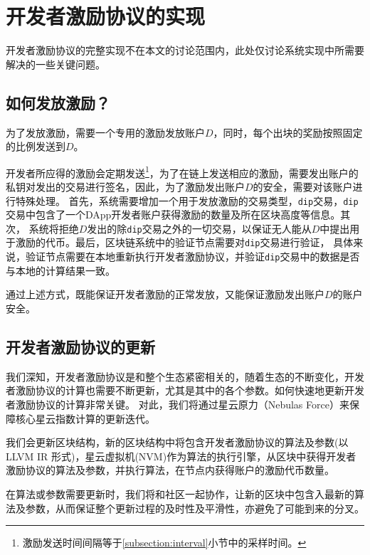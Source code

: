\section{开发者激励协议的实现}
开发者激励协议的完整实现不在本文的讨论范围内，此处仅讨论系统实现中所需要解决的一些关键问题。

\subsection{如何发放激励？}
为了发放激励，需要一个专用的激励发放账户$D$，同时，每个出块的奖励按照固定的比例发送到$D$。

开发者所应得的激励会定期发送\footnote{激励发送时间间隔等于\ref{subsection:interval}小节中的采样时间。}，为了在链上发送相应的激励，需要发出账户的私钥对发出的交易进行签名，因此，为了激励发出账户$D$的安全，需要对该账户进行特殊处理。
首先，系统需要增加一个用于发放激励的交易类型，\texttt{dip}交易，\texttt{dip}交易中包含了一个DApp开发者账户获得激励的数量及所在区块高度等信息。其次，
系统将拒绝$D$发出的除\texttt{dip}交易之外的一切交易，以保证无人能从$D$中提出用于激励的代币。最后，区块链系统中的验证节点需要对\texttt{dip}交易进行验证，
具体来说，验证节点需要在本地重新执行开发者激励协议，并验证\texttt{dip}交易中的数据是否与本地的计算结果一致。

通过上述方式，既能保证开发者激励的正常发放，又能保证激励发出账户$D$的账户安全。

\subsection{开发者激励协议的更新}
我们深知，开发者激励协议是和整个生态紧密相关的，随着生态的不断变化，开发者激励协议的计算也需要不断更新，尤其是其中的各个参数。如何快速地更新开发者激励协议的计算非常关键。
对此，我们将通过星云原力（Nebulas Force）来保障核心星云指数计算的更新迭代。

我们会更新区块结构，新的区块结构中将包含开发者激励协议的算法及参数(以 LLVM IR 形式)，星云虚拟机(NVM)作为算法的执行引擎，从区块中获得开发者激励协议的算法及参数，并执行算法，在节点内获得账户的激励代币数量。

在算法或参数需要更新时，我们将和社区一起协作，让新的区块中包含入最新的算法及参数，从而保证整个更新过程的及时性及平滑性，亦避免了可能到来的分叉。

